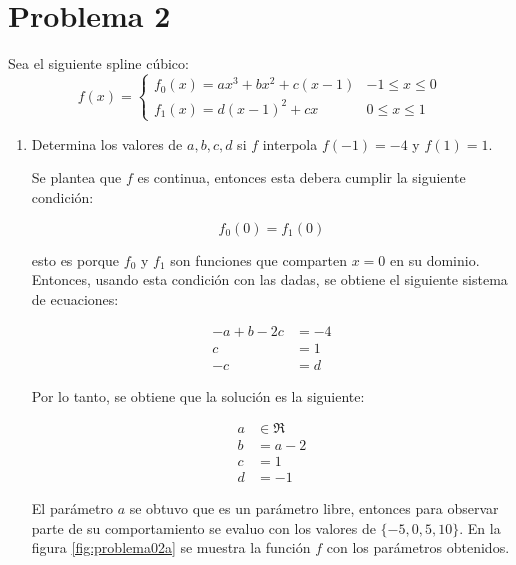 \section*{Problema 2}
Sea el siguiente spline cúbico:
\begin{equation*}
    f(x) = \begin{cases}
        f_0(x)= ax^3+bx^2+c(x-1) & -1\leq x \leq 0 \\
        f_1(x) = d(x-1)^2 +cx    & 0\leq x \leq 1
    \end{cases}
\end{equation*}
\begin{enumerate}
    \item Determina los valores de $a,b,c,d$ si $f$ interpola $f(-1)=-4$ y $f(1)=1$.

          Se plantea que $f$ es continua, entonces esta debera cumplir la siguiente condición:

          \begin{equation*}
              f_0(0) = f_1(0)
          \end{equation*}

          esto es porque $f_0$ y $f_1$  son funciones que comparten $x=0$ en su dominio. Entonces, usando esta condición con las dadas, se obtiene el siguiente sistema de ecuaciones:

          \begin{align*}
              -a+b-2c & = -4 \\
              c       & =1   \\
              -c      & =d
          \end{align*}

          Por lo tanto, se obtiene que la solución es la siguiente:

          \begin{align*}
              a & \in \Re \\
              b & = a-2   \\
              c & = 1     \\
              d & = -1
          \end{align*}

          El parámetro $a$ se obtuvo que es un parámetro libre, entonces para observar parte de su comportamiento se evaluo con los valores de $\{-5,0,5,10\}$. En la figura \ref{fig:problema02a} se muestra la función $f$ con los parámetros obtenidos.


\end{enumerate}
